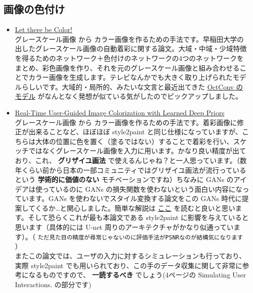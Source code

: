 \documentclass[a4paper, dvipdfmx, 10pt]{article}
\begin{document}
\subsection{画像の色付け}
\label{sec:orgaefc167}
\begin{itemize}
\item \href{http://iizuka.cs.tsukuba.ac.jp/projects/colorization/ja/}{Let there be Color!}\\

グレースケール画像 から カラー画像を作るための手法です。早稲田大学の出したグレースケール画像の自動着彩に関する論文。大域・中域・少域特徴を得るためのネットワーク＋色付けのネットワークの4つのネットワークをまとめ、彩色画像を作り、それを元のグレースケール画像と組み合わせることでカラー画像を生成します。テレビなんかでも大きく取り上げられたモデルらしいです。大域的・局所的、みたいな文言と最近出てきた \href{https://qiita.com/koshian2/items/0e40a5930f1aa63a66b9}{OctConv のモデル} がなんとなく発想が似ている気がしたのでピックアップしました。\\

\item \href{https://richzhang.github.io/ideepcolor/}{Real-Time User-Guided Image Colorization with Learned Deep Priors}\\

グレースケール画像 から カラー画像を作るための手法です。着彩画像に修正が出来ることなど、ほぼほぼ style2paint と同じ仕様になっていますが、こちらは大体の位置に色を置く（塗るではない）することで着彩を行い、スケッチではなくグレースケール画像を入力に用います。かなり良い精度が出ており、これ、 \textbf{グリザイユ画法} で使えるんじゃね？と一人思っています。（数年くらい前から日本の一部コミュニティではグリザイユ画法が流行っているという \textbf{学術的に価値のない} モチベーションですね）ちなみに GANs のアイデアは使っているのに GANs の損失関数を使わないという面白い内容になっています。GANs を使わないでスタイル変換する論文をこの GANs 時代に提案してくるか…と関心しました。簡単な解説は \href{https://github.com/DwangoMediaVillage/paper\_readings/issues/8}{ここ} を読むと良いと思います。そして恐らくこれが最も本論文である style2paint に影響を与えていると思います（具体的には U-net 周りのアーキテクチャがかなり似通っています）。（ \texttt{ただ見た目の精度が尋常じゃないのに評価手法がPSNRなのが結構気になります} ）\\

またこの論文では、ユーザの入力に対するシミュレーションも行っており、実際 style2paint でも用いられており、この手のデータ収集に関して非常に参考になるものですので、 \textbf{一読するべき} でしょう(4ページの Simulating User Interactions. の部分です)\\


\end{itemize}
\end{document}
